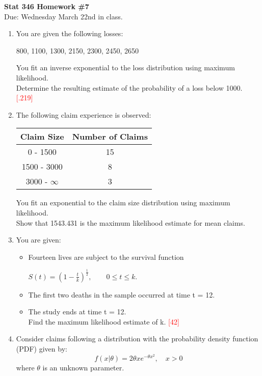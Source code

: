 \documentclass{article}
\begin{document}
\begin{center}
\textbf{Stat 346 Homework \#7}\\
Due: Wednesday March 22nd in class.
\vspace{0.3in}
\end{center}
	\begin{enumerate}
		\item You are given the following losses:
			\begin{center}
				800, 1100, 1300, 2150, 2300, 2450, 2650
			\end{center}
			You fit an inverse exponential to the loss distribution using maximum likelihood.\\
			Determine the resulting estimate of the probability of a loss below 1000. \textcolor{red}{[.219]}
		\item The following claim experience is observed:
		\begin{center}
			\begin{tabular}{c|c}
				Claim Size & Number of Claims\\
				\hline
				0 - 1500 & 15\\
				1500 - 3000 & 8\\
				3000 - $\infty$ & 3
			\end{tabular}
		\end{center}
			You fit an exponential to the claim size distribution using maximum likelihood.\\
			Show that 1543.431 is the maximum likelihood estimate for mean claims. 
		\item You are given:
			\begin{itemize}
				\item Fourteen lives are subject to the survival function
					\begin{center}
						$S(t) = (1-\frac{t}{k})^\frac{1}{2}, \qquad 0 \leq t \leq k.$
					\end{center}
				\item The first two deaths in the sample occurred at time t = 12.
				\item The study ends at time t = 12. \\
				Find the maximum likelihood estimate of k. \textcolor{red}{[42]}
			\end{itemize}
		\item 
Consider claims following a distribution with the probability density function (PDF) given by:
\[
f(x|\theta) = 2\theta x e^{-\theta x^2}, \quad x > 0
\]
where \(\theta\) is an unknown parameter.


\end{enumerate}
\end{document}
